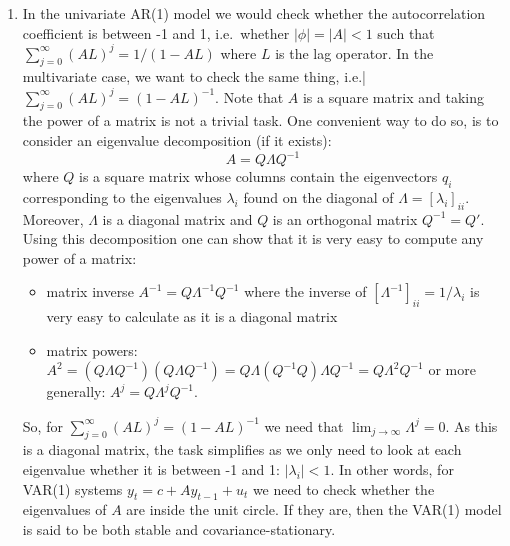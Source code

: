 \begin{enumerate}
\item 
In the univariate AR{(1)} model we would check whether the autocorrelation coefficient is between -1 and 1,
  i.e.\ whether \(|\phi| = |A|<1\) such that \(\sum_{j=0}^\infty {(AL)}^j=1/(1-AL)\)
  where \(L\) is the lag operator.
In the multivariate case, we want to check the same thing,
  i.e.| \(\sum_{j=0}^\infty {(AL)}^j={(1-AL)}^{-1}\).
Note that \(A\) is a square matrix and taking the power of a matrix is not a trivial task.
One convenient way to do so, is to consider an eigenvalue decomposition (if it exists):
\[A= Q \Lambda Q^{-1}\]
  where \(Q\) is a square matrix whose columns contain the eigenvectors \(q_i\)
  corresponding to the eigenvalues \(\lambda_i\) found on the diagonal of \(\Lambda = {[\lambda_i]}_{ii}\).
Moreover, \(\Lambda \) is a diagonal matrix and \(Q\) is an orthogonal matrix \(Q^{-1}=Q'\).
Using this decomposition one can show that it is very easy to compute any power of a matrix:
\begin{itemize}
\item matrix inverse \(A^{-1} = Q \Lambda^{-1} Q^{-1}\) where the inverse of \({[\Lambda^{-1}]}_{ii} = 1/\lambda_i\) is very easy to calculate as it is a diagonal matrix
\item matrix powers: \(A^2=(Q\Lambda Q^{-1})(Q\Lambda Q^{-1})=Q\Lambda (Q^{-1}Q) \Lambda Q^{-1} = Q \Lambda^2 Q^{-1}\) or more generally: \(A^j = Q \Lambda^j Q^{-1}\).
\end{itemize}
So, for \(\sum_{j=0}^\infty {(AL)}^j={(1-AL)}^{-1}\) we need that \(\lim_{j\rightarrow \infty}\Lambda^j=0\).
As this is a diagonal matrix, the task simplifies as we only need to look at each eigenvalue whether it is between -1 and 1: \(|\lambda_i|<1\).
In other words, for VAR{(1)} systems \(y_t = c + A y_{t-1} + u_t\) we need to check whether the eigenvalues of \(A\) are inside the unit circle.
If they are, then the VAR{(1)} model is said to be both stable and covariance-stationary.


\end{enumerate}
